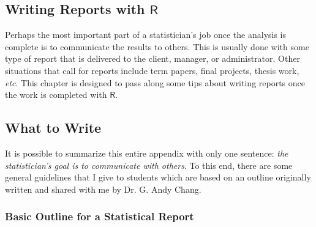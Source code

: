 \documentclass[captions=tableheading]{scrbook}
\begin{document}
\begin{example}
\chapter{Writing Reports with \(\mathsf{R}\)}
\label{sec-22}
\label{cha-Writing-Reports-with}


Perhaps the most important part of a statistician's job once the analysis is complete is to communicate the results to others. This is usually done with some type of report that is delivered to the client, manager, or administrator. Other situations that call for reports include term papers, final projects, thesis work, \emph{etc}. This chapter is designed to pass along some tips about writing reports once the work is completed with \(\mathsf{R}\).
\section{What to Write}
\label{sec-22-1}
\label{sec-What-to-Write}


It is possible to summarize this entire appendix with only one sentence: \emph{the statistician's goal is to communicate with others}. To this end, there are some general guidelines that I give to students which are based on an outline originally written and shared with me by Dr. G. Andy Chang.
\subsection{Basic Outline for a Statistical Report}
\label{sec-22-1-1}


\end{example}
\end{document}

